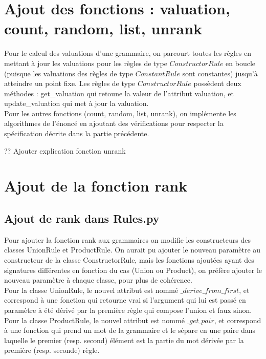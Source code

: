 \documentclass[a4paper, titlepage]{article}
\begin{document}
\section {Ajout des fonctions : valuation, count, random, list,  unrank}

Pour le calcul des valuations d'une grammaire, on parcourt toutes les
règles en mettant à jour les valuations pour les règles de type
$ConstructorRule$ en boucle (puisque les valuations des règles de type
$ConstantRule$ sont constantes) jusqu'à atteindre un point fixe.
Les règles de type $ConstructorRule$ possèdent deux méthodes :
get\_valuation qui retoune la valeur de l'attribut valuation, et
update\_valuation qui met à jour la valuation. \\

Pour les autres fonctions (count, random, list, unrank), on implémente
les algorithmes de l'énoncé en ajoutant des vérifications pour
respecter la spécification décrite dans la partie précédente.

?? Ajouter explication fonction unrank

\section {Ajout de la fonction rank}

\subsection {Ajout de rank dans Rules.py}
Pour ajouter la fonction rank aux grammaires on modifie les
constructeurs des classes UnionRule et ProductRule.
On aurait pu ajouter le nouveau paramètre au constructeur de la
classe ConstructorRule, mais les fonctions ajoutées ayant des
signatures différentes en fonction du cas (Union ou Product), on
préfère ajouter le nouveau paramètre à chaque classe, pour plus de
cohérence.\\


Pour la classe UnionRule, le nouvel attribut est nommé
$\_derive\_from\_first$, et correspond à une fonction qui retourne
vrai si l'argument qui lui est passé en paramètre à été dérivé par la
première règle qui compose l'union et faux sinon.\\


Pour la classe ProductRule, le nouvel attribut est nommé
$\_get\_pair$, et correspond à une fonction qui prend un mot de la
grammaire et le sépare en une paire dans laquelle le premier (resp. second) élément
est la partie du mot dérivée par la première (resp. seconde) règle.\\
\end{document}
